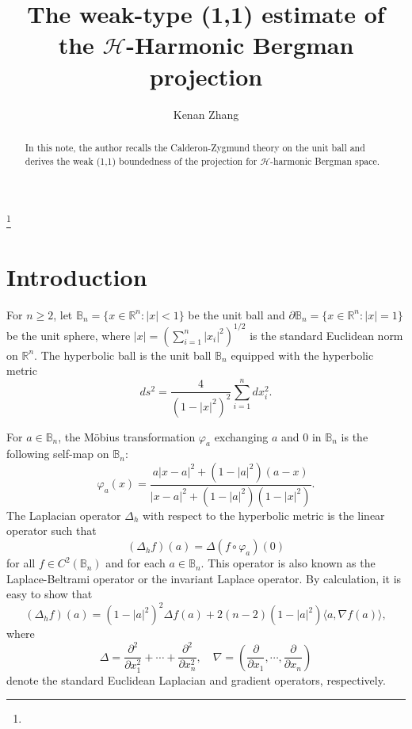 \documentclass[12pt]{amsart}
\theoremstyle{definition}
\theoremstyle{remark}
\newcommand{\R}{\mathbb{R}}
\newcommand{\B}{\mathbb{B}}
\begin{document}
\title{The weak-type (1,1) estimate of the $\mathcal{H}$-Harmonic Bergman projection}


\author%
{Kenan Zhang}
\address%
{Kenan Zhang\\
	School of Mathematical Sciences, Fudan University\\
	Shanghai, 200433, China}



\thanks{}





\begin{abstract}
	In this note, the author recalls the Calderon-Zygmund theory on the unit ball and derives the weak (1,1) boundedness of the projection for $\mathcal{H}$-harmonic Bergman space.
\end{abstract}


\maketitle

\setcounter{equation}{0}

\section{Introduction}
For $n\geqslant 2$, let $\B_n=\{x\in\mathbb{R}^n:|x|<1\}$ be the unit ball and $\partial\B_n=\{x\in\R^n:|x|=1\}$ be the unit sphere, where $|x|=(\sum_{i=1}^n|x_i|^2)^{1/2}$ is the standard Euclidean norm on $\mathbb{R}^n$. 
The hyperbolic ball is the unit ball $\B_n$ equipped with the hyperbolic metric
\[ds^2=\frac{4}{(1-|x|^2)^2}\sum\limits_{i=1}^n dx_i^2.\]

For $a\in\B_n$, the M\"{o}bius transformation $\varphi_a$ exchanging $a$ and $0$ in $\B_n$ is the following self-map on $\B_n$:  
\[
\varphi_a(x)=\frac{a|x-a|^2+(1-|a|^2)(a-x)}{|x-a|^2+(1-|a|^2)(1-|x|^2)}.
\] 
The Laplacian operator $\Delta_h$ with respect to the hyperbolic metric is the linear operator 
such that
\begin{equation}\label{1.1}
	(\Delta_hf)(a)=\Delta(f\circ\varphi_a)(0)
\end{equation}
for all $f\in C^2(\B_n)$ and for each $a\in\B_n$.
This operator is also known as the Laplace-Beltrami operator or the invariant Laplace operator. By calculation, it is easy to show that
\[(\Delta_hf)(a)=(1-|a|^2)^2\Delta f(a)+2(n-2)(1-|a|^2)\langle a,\nabla f(a)\rangle,\]
where 
\[\Delta=\frac{\partial^2}{\partial x_1^2}+\cdots+\frac{\partial^2}{\partial x_n^2},\quad\nabla=\left(\frac{\partial}{\partial x_1},\cdots,\frac{\partial}{\partial x_n}\right)\]
denote the standard Euclidean Laplacian and gradient operators, respectively.
\end{document}
